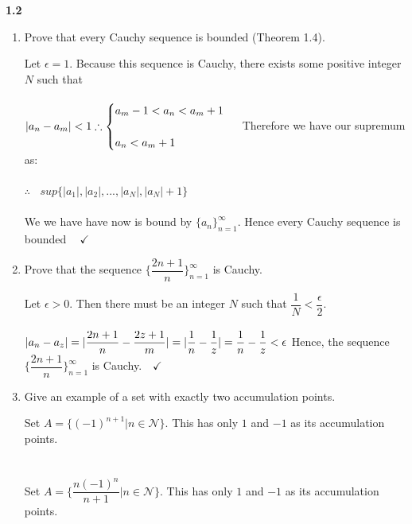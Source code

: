 \documentclass[fleqn]{article}
\begin{document}
  \textbf{1.2}
  \begin{enumerate}
    \item Prove that every Cauchy sequence is bounded (Theorem 1.4).

      \textcolor{hwColor}{
        Let $\epsilon=1$. Because this sequence is Cauchy, there exists some positive integer $N$ such that
        \\
        \\
        $
          |a_n-a_m|<1 \therefore \begin{cases}
            a_m-1<a_n<a_m+1
            \\
            \\
            a_n < a_m+1
          \end{cases}
          \\
          \\
          \\
        $
        Therefore we have our supremum as:
        \\
        \\
        $
          \therefore ~~~~ sup \{|a_1|, |a_2|, ..., |a_N|,|a_N|+1\}
        $
        \\
        \\
        We we have have now is bound by $\{a_n\}_{n=1}^{\infty}$. Hence every Cauchy sequence is bounded $ ~~~~ \checkmark$ 
        \\
      }

    \item Prove that the sequence $\{\dfrac{2n+1}{n}\}_{n=1}^{\infty}$ is Cauchy.

      \textcolor{hwColor}{
        Let $\epsilon > 0$. Then there must be an integer $N$ such that $\dfrac{1}{N}<\dfrac{\epsilon}{2}$.
        \\
        \\
        $
          |a_n-a_z|=|\dfrac{2n+1}{n}-\dfrac{2z+1}{m}|=|\dfrac{1}{n}-\dfrac{1}{z}|=\dfrac{1}{n}-\dfrac{1}{z} < \epsilon
          \\
          \\
        $
        Hence, the sequence $\{\dfrac{2n+1}{n}\}_{n=1}^{\infty}$ is Cauchy. $~~~ \checkmark$
        \\
      }

    \item Give an example of a set with exactly two accumulation points.

      \textcolor{hwColor}{
        Set $A=\{(-1)^{n+1} | n \in \mathcal{N} \}$. This has only $1$ and $-1$ as its accumulation points.
        \\
        \\
        \\
        Set $A=\{\dfrac{n(-1)^n}{n+1} | n \in \mathcal{N} \}$. This has only $1$ and $-1$ as its accumulation points.
        \\
      }


\end{enumerate}
\end{document}
